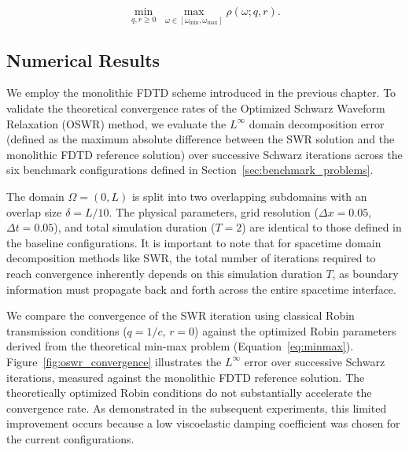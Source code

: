 \documentclass{Configuration_Files/PoliMi3i_thesis}
\begin{document}
\begin{equation}
\operatorname*{min}_{q,r\ge0}
\;
\max_{\omega\in[\omega_{\min},\omega_{\max}]}
\rho(\omega;q,r).
\label{eq:minmax}
\end{equation}

\subsection{Numerical Results}

We employ the monolithic FDTD scheme introduced in the previous chapter. To validate the theoretical convergence rates of the Optimized Schwarz Waveform Relaxation (OSWR) method, we evaluate the $L^\infty$ domain decomposition error (defined as the maximum absolute difference between the SWR solution and the monolithic FDTD reference solution) over successive Schwarz iterations across the six benchmark configurations defined in Section~\ref{sec:benchmark_problems}.

The domain $\Omega=(0,L)$ is split into two overlapping subdomains with an overlap size $\delta=L/10$. The physical parameters, grid resolution ($\Delta x=0.05$, $\Delta t=0.05$), and total simulation duration ($T=2$) are identical to those defined in the baseline configurations. It is important to note that for spacetime domain decomposition methods like SWR, the total number of iterations required to reach convergence inherently depends on this simulation duration $T$, as boundary information must propagate back and forth across the entire spacetime interface.

We compare the convergence of the SWR iteration using classical Robin transmission conditions ($q=1/c$, $r=0$) against the optimized Robin parameters derived from the theoretical min-max problem (Equation~\ref{eq:minmax}). Figure~\ref{fig:oswr_convergence} illustrates the $L^\infty$ error over successive Schwarz iterations, measured against the monolithic FDTD reference solution. The theoretically optimized Robin conditions do not substantially accelerate the convergence rate. As demonstrated in the subsequent experiments, this limited improvement occurs because a low viscoelastic damping coefficient was chosen for the current configurations.
\end{document}
